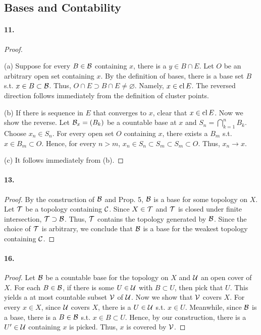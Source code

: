 \subsection{Bases and Contability}
\paragraph{11.}
\begin{proof}
  $\,$\par
  (a) Suppose for every $B\in\mathcal{B}$ containing $x$, there is a $y\in 
  B\cap E$. Let $O$ be an arbitrary open set containing $x$. By the definition
  of bases, there is a base set $B$ s.t. $x \in B \subset \mathcal{B}$. Thus,
  $O\cap E \supset B\cap E \ne \varnothing$. Namely, $x \in \operatorname{cl} E$. The
  reversed direction follows immediately from the definition of cluster points.
  
  (b) If there is sequence in $E$ that converges to $x$, clear that $x\in
  \operatorname{cl} E$. Now we show the reverse. Let $\mathcal{B}_x = (B_k)$ be a countable base
  at $x$ and $S_n = \bigcap_{k=1}^n B_k$. Choose $x_n \in S_n$. For every
  open set $O$ containing $x$, there exists a $B_m$ s.t. $x \in B_m
  \subset O$. Hence, for every $n > m$, $x_n \in S_n\subset S_m
  \subset S_m \subset O$. Thus, $x_n \to x$.
  
  (c) It follows immediately from (b).
\end{proof}

\paragraph{13.}
\begin{proof}
  By the construction of $\mathcal{B}$ and Prop. 5, $\mathcal{B}$ is a base for some
  topology on $X$. Let $\mathcal{T}$ be a topology containing $\mathcal{C}$. Since
  $X \in \mathcal{T}$ and $\mathcal{T}$ is closed under finite intersection,
  $\mathcal{T} \supset \mathcal{B}$. Thus, $\mathcal{T}$ contains the topology generated
  by $\mathcal{B}$. Since the choice of $\mathcal{T}$ is arbitrary, we conclude that
  $\mathcal{B}$ is a base for the weakest topology containing $\mathcal{C}$.
\end{proof}


\paragraph{16.}
\begin{proof}
  Let $\mathcal{B}$ be a countable base for the topology on $X$ and 
  $\mathcal{U}$ an open cover of $X$. For each $B\in\mathcal{B}$, if there is
  some $U \in \mathcal{U}$ with $B \subset U$, then pick that $U$. This yields
  a at most countable subset $\mathcal{V}$ of $\mathcal{U}$. Now we show that 
  $\mathcal{V}$ covers $X$. For every $x\in X$, since $\mathcal{U}$ covers $X$, there
  is a $U\in\mathcal{U}$ s.t. $x\in U$. Meanwhile, since $\mathcal{B}$ is a base, 
  there is a $B \in \mathcal{B}$ s.t. $x\in B \subset U$. Hence, by our
  construction, there is a $U^\prime \in \mathcal{U}$ containing $x$ is picked. Thus,
  $x$ is covered by $\mathcal{V}$.
\end{proof}

